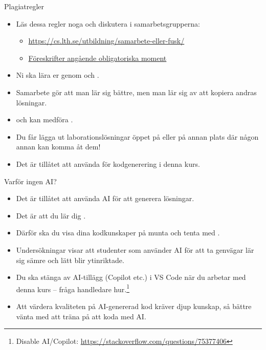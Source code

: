 \begin{SlideExtra}{Plagiatregler}
\begin{itemize}
\item Läs dessa regler noga och diskutera i samarbetsgrupperna:

\begin{itemize}
\footnotesize
\item \url{https://cs.lth.se/utbildning/samarbete-eller-fusk/}
\item \href{https://cs.lth.se/utbildning/foereskrifter-angaaende-obligatoriska-moment/}{Föreskrifter angående obligatoriska moment}
\end{itemize}
\item Ni ska lära er genom  och  .
\item Samarbete gör att man lär sig bättre, men man lär sig  av att kopiera andras lösningar.
\item {} och kan medföra .
\item Du får  lägga ut laborationslösningar öppet på  eller på annan plats där någon annan kan komma åt dem!
\item Det är  tillåtet att använda  för kodgenerering i denna kurs.
\end{itemize}

\end{SlideExtra}

\begin{SlideExtra}{Varför ingen AI?}
\begin{itemize}
\item Det är  tillåtet att använda AI för att generera lösningar. 
\item Det är  att du lär dig .
\item Därför ska du visa dina kodkunskaper på munta och tenta med .
\item Undersökningar visar att studenter som använder AI för att ta genvägar lär sig sämre och lätt blir ytinriktade.
\item Du ska stänga av AI-tillägg (Copilot etc.) i VS Code  när du arbetar med denna kurs -- fråga handledare hur.\footnote{Disable AI/Copilot: \url{https://stackoverflow.com/questions/75377406}}
\item Att värdera kvaliteten på AI-genererad kod kräver djup kunskap, så bättre vänta med att träna på att koda med AI.

\end{itemize}

\end{SlideExtra}

